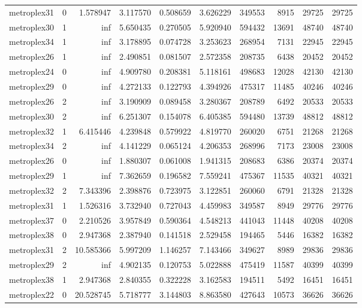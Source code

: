 \begin{longtable}{|l|r|r|r|r|r|r|r|r|r|}
metroplex31 & 0 & 1.578947 & 3.117570 & 0.508659 & 3.626229 & 349553 & 8915 & 29725 & 29725 \\
metroplex30 & 1 & inf & 5.650435 & 0.270505 & 5.920940 & 594432 & 13691 & 48740 & 48740 \\
metroplex34 & 1 & inf & 3.178895 & 0.074728 & 3.253623 & 268954 & 7131 & 22945 & 22945 \\
metroplex26 & 1 & inf & 2.490851 & 0.081507 & 2.572358 & 208735 & 6438 & 20452 & 20452 \\
metroplex24 & 0 & inf & 4.909780 & 0.208381 & 5.118161 & 498683 & 12028 & 42130 & 42130 \\
metroplex29 & 0 & inf & 4.272133 & 0.122793 & 4.394926 & 475317 & 11485 & 40246 & 40246 \\
metroplex26 & 2 & inf & 3.190909 & 0.089458 & 3.280367 & 208789 & 6492 & 20533 & 20533 \\
metroplex30 & 2 & inf & 6.251307 & 0.154078 & 6.405385 & 594480 & 13739 & 48812 & 48812 \\
metroplex32 & 1 & 6.415446 & 4.239848 & 0.579922 & 4.819770 & 260020 & 6751 & 21268 & 21268 \\
metroplex34 & 2 & inf & 4.141229 & 0.065124 & 4.206353 & 268996 & 7173 & 23008 & 23008 \\
metroplex26 & 0 & inf & 1.880307 & 0.061008 & 1.941315 & 208683 & 6386 & 20374 & 20374 \\
metroplex29 & 1 & inf & 7.362659 & 0.196582 & 7.559241 & 475367 & 11535 & 40321 & 40321 \\
metroplex32 & 2 & 7.343396 & 2.398876 & 0.723975 & 3.122851 & 260060 & 6791 & 21328 & 21328 \\
metroplex31 & 1 & 1.526316 & 3.732940 & 0.727043 & 4.459983 & 349587 & 8949 & 29776 & 29776 \\
metroplex37 & 0 & 2.210526 & 3.957849 & 0.590364 & 4.548213 & 441043 & 11448 & 40208 & 40208 \\
metroplex38 & 0 & 2.947368 & 2.387940 & 0.141518 & 2.529458 & 194465 & 5446 & 16382 & 16382 \\
metroplex31 & 2 & 10.585366 & 5.997209 & 1.146257 & 7.143466 & 349627 & 8989 & 29836 & 29836 \\
metroplex29 & 2 & inf & 4.902135 & 0.120753 & 5.022888 & 475419 & 11587 & 40399 & 40399 \\
metroplex38 & 1 & 2.947368 & 2.840355 & 0.322228 & 3.162583 & 194511 & 5492 & 16451 & 16451 \\
metroplex22 & 0 & 20.528745 & 5.718777 & 3.144803 & 8.863580 & 427643 & 10573 & 36626 & 36626 \\

\end{longtable}

